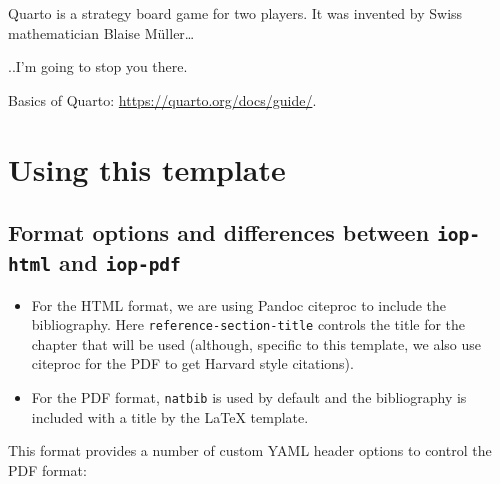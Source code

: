\documentclass[
  12pt]{iopart}
\providecommand{\tightlist}{%
  \setlength{\itemsep}{0pt}\setlength{\parskip}{0pt}}\usepackage{longtable,booktabs,array}
\begin{document}
Quarto is a strategy board game for two players. It was invented by
Swiss mathematician Blaise Müller\ldots{}

..I'm going to stop you there.

Basics of Quarto: \url{https://quarto.org/docs/guide/}.

\section{Using this template}\label{using-this-template}

\subsection{\texorpdfstring{Format options and differences between
\texttt{iop-html} and
\texttt{iop-pdf}}{Format options and differences between iop-html and iop-pdf}}\label{sec-formopt}

\begin{itemize}
\tightlist
\item
  For the HTML format, we are using Pandoc citeproc to include the
  bibliography. Here \texttt{reference-section-title} controls the title
  for the chapter that will be used (although, specific to this
  template, we also use citeproc for the PDF to get Harvard style
  citations).
\item
  For the PDF format, \texttt{natbib} is used by default and the
  bibliography is included with a title by the {\LaTeX} template.
\end{itemize}

This format provides a number of custom YAML header options to control
the PDF format:
\end{document}
